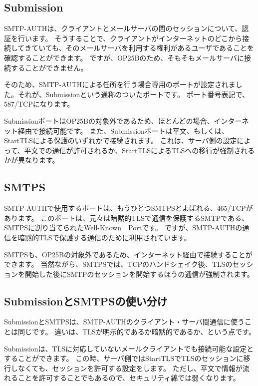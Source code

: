 \subsection{Submission}

SMTP-AUTHは、クライアントとメールサーバの間のセッションについて、認証を行います。
そうすることで、クライアントがインターネットのどこから接続してきていても、そのメールサーバを利用する権利があるユーザであることを確認することができます。
ですが、OP25Bのため、そもそもメールサーバに接続することができません。

そのため、SMTP-AUTHによる任所を行う場合専用のポートが設定されました。それが、Submissionという通称のついたポートです。
ポート番号表記で、587/TCPになります。

SubmissionポートはOP25Bの対象外であるため、ほとんどの場合、インターネット経由で接続可能です。
また、Submissionポートは平文、もしくは、StartTLSによる保護のいずれかで接続されます。
これは、サーバ側の設定によって、平文での通信が許可されるか、StartTLSによるTLSへの移行が強制されるかが異なります。

\subsection{SMTPS}

SMTP-AUTHで使用するポートは、もうひとつSMTPSとよばれる、465/TCPがあります。
このポートは、元々は暗黙的TLSで通信を保護するSMTPである、SMTPSに割り当てられたWell-Known　Portです。
ですが、SMTP-AUTHの通信を暗黙的TLSで保護する通信のために利用されています。

SMTPSも、OP25Bの対象外であるため、インターネット経由で接続することができます。
当然ながら、SMTPSでは、TCPのハンドシェイク後、TLSのセッションを開始した後にSMTPのセッションを開始するほうの通信が強制されます。

\subsection{SubmissionとSMTPSの使い分け}

SubmissionとSMTPSは、SMTP-AUTHのクライアント・サーバ間通信に使うことは同じです。
違いは、TLSが明示的であるか暗黙的であるか、という点です。

Submissionは、TLSに対応していないメールクライアントでも接続可能な設定とすることができます。
この時、サーバ側ではStartTLSでTLSのセッションに移行しなくても、セッションを許可する設定をします。
ただし、平文で情報が流れることを許可することでもあるので、セキュリティ綿では弱くなります。

